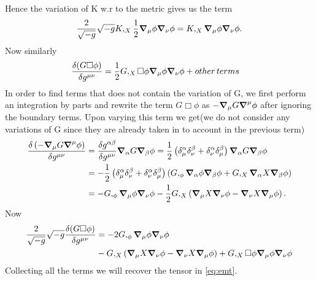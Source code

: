 \documentclass[12pt,a4paper,draft]{article}
\begin{document}
Hence the variation of K w.r to the metric gives us the term 
\begin{equation}
    \frac{2}{\sqrt{-g}} \sqrt{-g} K,_X \frac{1}{2} \grad_{\mu} \phi \grad_{\nu} \phi = K,_X  \grad_{\mu} \phi \grad_{\nu} \phi.
\end{equation}
Now similarly
\begin{equation}
\begin{split}
    \fdv{(G \Box \phi)}{g^{\mu \nu}} &= \frac{1}{2} G,_{X}\Box \phi \grad_{\mu} \phi \grad_{\nu} \phi + other\, terms
    \end{split}
\end{equation}
In order to find terms that does not contain the variation of G, we first perform an integration by parts and rewrite the term  $G \Box \phi$ as $-\grad_{\mu} G \grad^{\mu} \phi$ after ignoring the boundary terms. Upon varying this term we get(we do not consider any variations of G since they are already taken in to account in the previous term)
\begin{equation}
\begin{split}
  \fdv{  \left(-\grad_{\mu} G \grad^{\mu} \phi\right)}{g^{\mu \nu}} & = \fdv{ g^{\alpha \beta}}{g^{\mu \nu}} \grad_{\alpha} G \grad_{\beta} \phi 
  = \frac{1}{2} \left( \delta^{\alpha}_{\mu} \delta^{\beta}_{\nu}+ \delta^{\alpha}_{\nu} \delta^{\beta}_{\mu} \right) \grad_{\alpha} G \grad_{\beta} \phi \\
  &=  -\frac{1}{2} \left( \delta^{\alpha}_{\mu} \delta^{\beta}_{\nu}+ \delta^{\alpha}_{\nu} \delta^{\beta}_{\mu} \right) \left( G,_{\phi} \grad_{\alpha} \phi \grad_{\beta} \phi + G,_X  \grad_{\alpha} X \grad_{\beta} \phi\right)\\
  &= - G,_{\phi} \grad_{\mu} \phi \grad_{\nu} \phi-\frac{1}{2} G,_X \left(  \grad_{\mu} X \grad_{\nu} \phi -\grad_{\nu} X \grad_{\mu} \phi \right).
    \end{split}
\end{equation}
Now
\begin{equation}
\begin{split}
    \frac{2}{\sqrt{-g}} \sqrt{-g} \fdv{(G \Box \phi)}{g^{\mu \nu}} &= - 2 G,_{\phi} \grad_{\mu} \phi \grad_{\nu} \phi\\
    &- G,_X \left(  \grad_{\mu} X \grad_{\nu} \phi -\grad_{\nu} X \grad_{\mu} \phi \right)+ G,_{X}\Box \phi \grad_{\mu} \phi \grad_{\nu} \phi
    \end{split}
\end{equation} 
Collecting all the terms we will recover the tensor in \eqref{eq:emt}.
\end{document}
